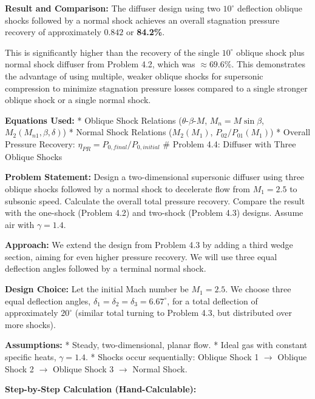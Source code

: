 \textbf{Result and Comparison:} The diffuser design using two
\(10^\circ\) deflection oblique shocks followed by a normal shock
achieves an overall stagnation pressure recovery of approximately
\(\mathbf{0.842}\) or \textbf{84.2\%}.

This is significantly higher than the recovery of the single
\(10^\circ\) oblique shock plus normal shock diffuser from Problem 4.2,
which was \(\approx 69.6\%\). This demonstrates the advantage of using
multiple, weaker oblique shocks for supersonic compression to minimize
stagnation pressure losses compared to a single stronger oblique shock
or a single normal shock.

\textbf{Equations Used:} * Oblique Shock Relations
(\(\theta\)-\(\beta\)-\(M\), \(M_n = M \sin\beta\),
\(M_2(M_{n1}, \beta, \delta)\)) * Normal Shock Relations (\(M_2(M_1)\),
\(P_{02}/P_{01}(M_1)\)) * Overall Pressure Recovery:
\(\eta_{PR} = P_{0, final}/P_{0, initial}\) \# Problem 4.4: Diffuser
with Three Oblique Shocks

\textbf{Problem Statement:} Design a two-dimensional supersonic diffuser
using three oblique shocks followed by a normal shock to decelerate flow
from \(M_1=2.5\) to subsonic speed. Calculate the overall total pressure
recovery. Compare the result with the one-shock (Problem 4.2) and
two-shock (Problem 4.3) designs. Assume air with \(\gamma = 1.4\).

\textbf{Approach:} We extend the design from Problem 4.3 by adding a
third wedge section, aiming for even higher pressure recovery. We will
use three equal deflection angles followed by a terminal normal shock.

\textbf{Design Choice:} Let the initial Mach number be \(M_1 = 2.5\). We
choose three equal deflection angles,
\(\delta_1 = \delta_2 = \delta_3 = 6.67^\circ\), for a total deflection
of approximately \(20^\circ\) (similar total turning to Problem 4.3, but
distributed over more shocks).

\textbf{Assumptions:} * Steady, two-dimensional, planar flow. * Ideal
gas with constant specific heats, \(\gamma = 1.4\). * Shocks occur
sequentially: Oblique Shock 1 \(\to\) Oblique Shock 2 \(\to\) Oblique
Shock 3 \(\to\) Normal Shock.

\textbf{Step-by-Step Calculation (Hand-Calculable):}

